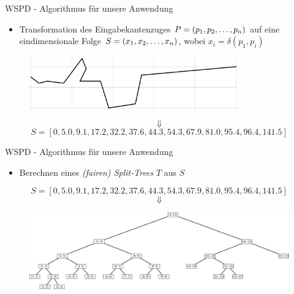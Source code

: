 \documentclass{beamer}
\begin{document}
	\begin{frame}{WSPD - Algorithmus für unsere Anwendung}
		\begin{itemize}
			\item Transformation des Eingabekantenzuges $P = (p_1, p_2, \mathellipsis, p_n)$ auf eine eindimensionale Folge $S = (x_1, x_2, \mathellipsis, x_n)$, wobei $x_i = \delta(p_1, p_i)$
		\end{itemize}
		\begin{figure}
			\centering
			\includegraphics[width=0.8\textwidth]{raw_path_cropped.png}
		\end{figure}
		\[\Downarrow\]
		\[S = [0, 5.0, 9.1, 17.2, 32.2, 37.6, 44.3, 54.3, 67.9, 81.0, 95.4, 96.4, 141.5]\]
	\end{frame}
	
	\begin{frame}{WSPD - Algorithmus für unsere Anwendung}
		\begin{itemize}
			\item Berechnen eines \emph{(fairen) Split-Trees} $T$ aus $S$
		\end{itemize}
		\[S = [0, 5.0, 9.1, 17.2, 32.2, 37.6, 44.3, 54.3, 67.9, 81.0, 95.4, 96.4, 141.5]\]
		\[\Downarrow\]
		\begin{figure}
			\centering
			\includegraphics[width=\textwidth]{split_tree.png}
		\end{figure}
	\end{frame}
	
\end{document}
